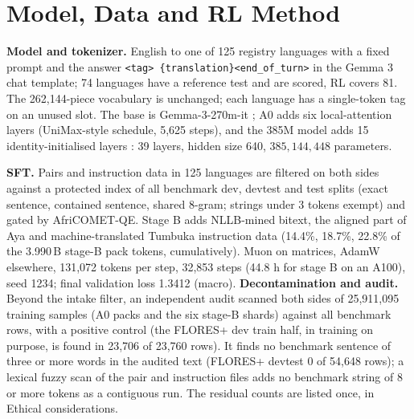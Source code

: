 \section{Model, Data and RL Method}\label{sec:method}
\textbf{Model and tokenizer.} English to one of 125 registry languages with a fixed prompt and the answer \texttt{<tag> \{translation\}<end\_of\_turn>} in the Gemma 3 chat template; 74 languages have a reference test and are scored, RL covers 81. The 262,144-piece vocabulary is unchanged; each language has a single-token tag on an unused slot. The base is Gemma-3-270m-it \citep{gemmateam2025gemma3}; A0 adds six local-attention layers (UniMax-style schedule, 5,625 steps), and the 385M model adds 15 identity-initialised layers \citep[cf.][]{wu2024llamapro,kim2023solar}: 39 layers, hidden size 640, $385{,}144{,}448$ parameters.

\textbf{SFT.} Pairs and instruction data in 125 languages are filtered on both sides against a protected index of all benchmark dev, devtest and test splits (exact sentence, contained sentence, shared 8-gram; strings under 3 tokens exempt) and gated by AfriCOMET-QE. Stage B adds NLLB-mined bitext, the aligned part of Aya \citep{singh2024aya} and machine-translated Tumbuka instruction data (14.4\%, 18.7\%, 22.8\% of the 3.990\,B stage-B pack tokens, cumulatively). Muon \citep{liu2025muon} on matrices, AdamW elsewhere, 131,072 tokens per step, 32,853 steps (44.8 h for stage B on an A100), seed 1234; final validation loss 1.3412 (macro). \textbf{Decontamination and audit.} Beyond the intake filter, an independent audit scanned both sides of 25,911,095 training samples (A0 packs and the six stage-B shards) against all benchmark rows, with a positive control (the FLORES+ dev train half, in training on purpose, is found in 23,706 of 23,760 rows). It finds no benchmark sentence of three or more words in the audited text (FLORES+ devtest 0 of 54,648 rows); a lexical fuzzy scan of the pair and instruction files adds no benchmark string of 8 or more tokens as a contiguous run. The residual counts are listed once, in Ethical considerations.

